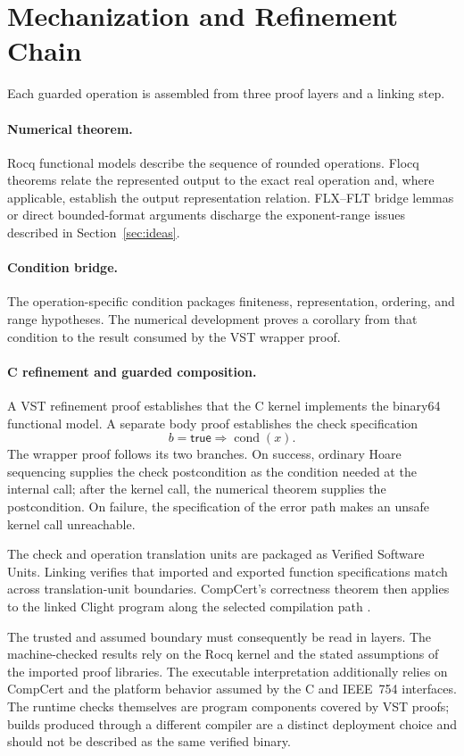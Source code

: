 \section{Mechanization and Refinement Chain}
\label{sec:mechanization}

Each guarded operation is assembled from three proof layers and a linking step.

\paragraph{Numerical theorem.}
Rocq functional models describe the sequence of rounded operations.  Flocq
theorems relate the represented output to the exact real operation and, where
applicable, establish the output representation relation.  FLX--FLT bridge
lemmas or direct bounded-format arguments discharge the exponent-range issues
described in Section~\ref{sec:ideas}.

\paragraph{Condition bridge.}
The operation-specific condition packages finiteness, representation, ordering,
and range hypotheses.  The numerical development proves a corollary from that
condition to the result consumed by the VST wrapper proof.

\paragraph{C refinement and guarded composition.}
A VST refinement proof establishes that the C kernel implements the binary64
functional model.  A separate body proof establishes the check specification
\[
  b=\mathsf{true}\Longrightarrow\operatorname{cond}(x).
\]
The wrapper proof follows its two branches.  On success, ordinary Hoare
sequencing supplies the check postcondition as the condition needed at the
internal call; after the kernel call, the numerical theorem supplies the
postcondition.  On failure, the specification of the error path makes an unsafe
kernel call unreachable.

The check and operation translation units are packaged as Verified Software
Units.  Linking verifies that imported and exported function specifications
match across translation-unit boundaries.  CompCert's correctness theorem then
applies to the linked Clight program along the selected compilation path
\cite{Appel2014}.

The trusted and assumed boundary must consequently be read in layers.  The
machine-checked results rely on the Rocq kernel and the stated assumptions of
the imported proof libraries.  The executable interpretation additionally
relies on CompCert and the platform behavior assumed by the C and IEEE~754
interfaces.  The runtime checks themselves are program components covered by
VST proofs; builds produced through a different compiler are a distinct
deployment choice and should not be described as the same verified binary.

